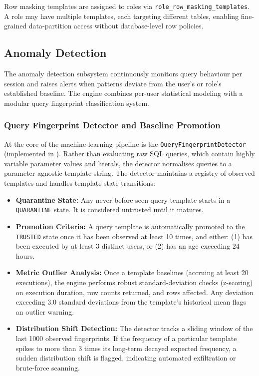 Row masking templates are assigned to roles via \texttt{role\_row\_masking\_templates}. A role may have multiple templates, each targeting different tables, enabling fine-grained data-partition access without database-level row policies.

\subsection{Anomaly Detection}
\label{subsec:anomaly-detection}

The anomaly detection subsystem continuously monitors query behaviour per session and raises alerts when patterns deviate from the user's or role's established baseline. The engine combines per-user statistical modeling with a modular query fingerprint classification system.

\subsubsection{Query Fingerprint Detector and Baseline Promotion}

At the core of the machine-learning pipeline is the \texttt{QueryFingerprintDetector} (implemented in ). Rather than evaluating raw SQL queries, which contain highly variable parameter values and literals, the detector normalises queries to a parameter-agnostic template string. The detector maintains a registry of observed templates and handles template state transitions:

\begin{itemize}[leftmargin=*]
    \item \textbf{Quarantine State:} Any never-before-seen query template starts in a \texttt{QUARANTINE} state. It is considered untrusted until it matures.
    \item \textbf{Promotion Criteria:} A query template is automatically promoted to the \texttt{TRUSTED} state once it has been observed at least 10 times, and either: (1) has been executed by at least 3 distinct users, or (2) has an age exceeding 24 hours.
    \item \textbf{Metric Outlier Analysis:} Once a template baselines (accruing at least 20 executions), the engine performs robust standard-deviation checks (z-scoring) on execution duration, row counts returned, and rows affected. Any deviation exceeding 3.0 standard deviations from the template's historical mean flags an outlier warning.
    \item \textbf{Distribution Shift Detection:} The detector tracks a sliding window of the last 1000 observed fingerprints. If the frequency of a particular template spikes to more than 3 times its long-term decayed expected frequency, a sudden distribution shift is flagged, indicating automated exfiltration or brute-force scanning.
\end{itemize}

